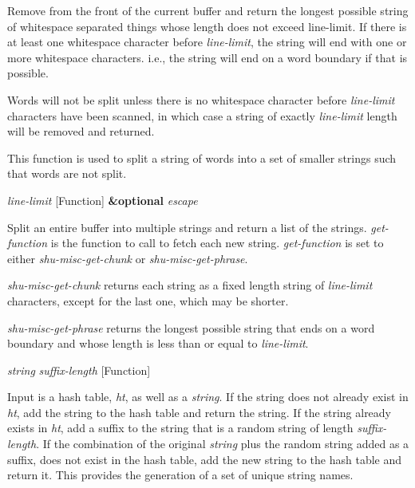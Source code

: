 \begin{doc-string}
Remove from the front of the current buffer and return the longest possible
string of whitespace separated things whose length does not exceed line-limit.
If there is at least one whitespace character before \emph{line-limit}, the string will
end with one or more whitespace characters.  i.e., the string will end on a word
boundary if that is possible.

Words will not be split unless there is no whitespace character before
\emph{line-limit} characters have been scanned, in which case a string of exactly
\emph{line-limit} length will be removed and returned.

This function is used to split a string of words into a set of smaller strings
such that words are not split.
\end{doc-string}

\vspace{1em}
\noindent
{}
\usebox{\funcname}\emph{line-limit}
 \hfill [Function]
\hspace*{\wd\funcname}\textbf{\&optional} \emph{escape}

\begin{doc-string}
Split an entire buffer into multiple strings and return a list of the
strings.  \emph{get-function} is the function to call to fetch each new string.
\emph{get-function} is set to either \emph{shu-misc-get-chunk} or \emph{shu-misc-get-phrase}.

\emph{shu-misc-get-chunk} returns each string as a fixed length string of \emph{line-limit}
characters, except for the last one, which may be shorter.

\emph{shu-misc-get-phrase} returns the longest possible string that ends on a word
boundary and whose length is less than or equal to \emph{line-limit}.
\end{doc-string}

\vspace{1em}
\noindent
{}
\usebox{\funcname}\emph{string} \emph{suffix-length}
 \hfill [Function]
\hspace*{\wd\funcname}

\begin{doc-string}
Input is a hash table, \emph{ht}, as well as a \emph{string}.  If the string does not
already exist in \emph{ht}, add the string to the hash table and return the string.
If the string already exists in \emph{ht}, add a suffix to the string that is a
random string of length \emph{suffix-length}.  If the combination of the original
\emph{string} plus the random string added as a suffix, does not exist in the hash
table, add the new string to the hash table and return it.  This provides the
generation of a set of unique string names.
\end{doc-string}

